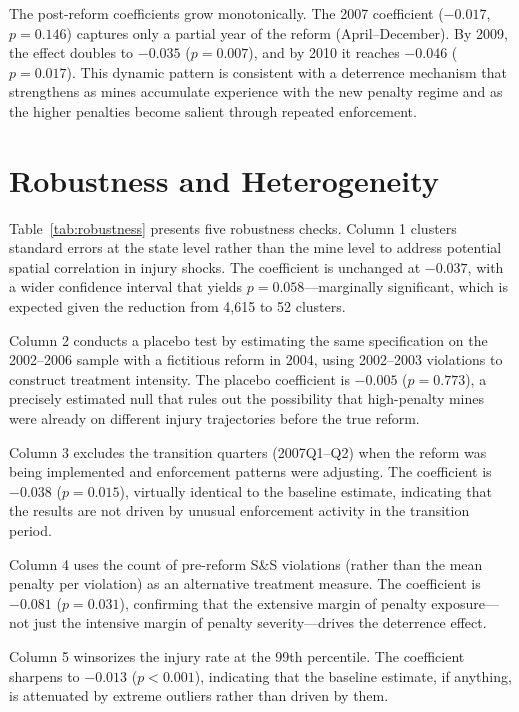 \documentclass[12pt]{article}
\begin{document}
The post-reform coefficients grow monotonically. The 2007 coefficient ($-0.017$, $p = 0.146$) captures only a partial year of the reform (April--December). By 2009, the effect doubles to $-0.035$ ($p = 0.007$), and by 2010 it reaches $-0.046$ ($p = 0.017$). This dynamic pattern is consistent with a deterrence mechanism that strengthens as mines accumulate experience with the new penalty regime and as the higher penalties become salient through repeated enforcement.


\section{Robustness and Heterogeneity}



Table~\ref{tab:robustness} presents five robustness checks. Column 1 clusters standard errors at the state level rather than the mine level to address potential spatial correlation in injury shocks. The coefficient is unchanged at $-0.037$, with a wider confidence interval that yields $p = 0.058$---marginally significant, which is expected given the reduction from 4,615 to 52 clusters.

Column 2 conducts a placebo test by estimating the same specification on the 2002--2006 sample with a fictitious reform in 2004, using 2002--2003 violations to construct treatment intensity. The placebo coefficient is $-0.005$ ($p = 0.773$), a precisely estimated null that rules out the possibility that high-penalty mines were already on different injury trajectories before the true reform.

Column 3 excludes the transition quarters (2007Q1--Q2) when the reform was being implemented and enforcement patterns were adjusting. The coefficient is $-0.038$ ($p = 0.015$), virtually identical to the baseline estimate, indicating that the results are not driven by unusual enforcement activity in the transition period.

Column 4 uses the count of pre-reform S\&S violations (rather than the mean penalty per violation) as an alternative treatment measure. The coefficient is $-0.081$ ($p = 0.031$), confirming that the extensive margin of penalty exposure---not just the intensive margin of penalty severity---drives the deterrence effect.

Column 5 winsorizes the injury rate at the 99th percentile. The coefficient sharpens to $-0.013$ ($p < 0.001$), indicating that the baseline estimate, if anything, is attenuated by extreme outliers rather than driven by them.
\end{document}
